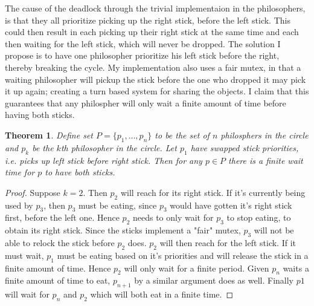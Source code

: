 \documentclass{article}
\newtheorem{theorem}[section]{Theorem}
\begin{document}
The cause of the deadlock through the trivial implementaion in the philosophers, is that they all prioritize picking up the right stick, before the left stick. This could then result in each picking up their right stick at the same time and each then waiting for the left stick, which will never be dropped. The solution I propose is to have one philosopher prioritize his left stick before the right, thereby breaking the cycle. My implementation also uses a fair mutex, in that a waiting philosopher will pickup the stick before the one who dropped it may pick it up again; creating a turn based system for sharing the objects. I claim that this guarantees that any philospher will only wait a finite amount of time before having both sticks.

\begin{theorem}
  Define set $P = \{p_1, \dots, p_n\}$ to be the set of $n$ philosphers in the circle and $p_k$ be the $k$th philosopher in the circle. Let $p_1$ have swapped stick priorities, i.e. picks up left stick before right stick. Then for any $p \in P$ there is a finite wait time for $p$ to have both sticks.
\end{theorem}

\begin{proof}
  Suppose $k = 2$. Then $p_2$ will reach for its right stick. If it's currently being used by $p_3$, then $p_3$ must be eating, since $p_3$ would have gotten it's right stick first, before the left one. Hence $p_2$ needs to only wait for $p_3$ to stop eating, to obtain its right stick. Since the sticks implement a "fair" mutex, $p_3$ will not be able to relock the stick before $p_2$ does. $p_2$ will then reach for the left stick. If it must wait, $p_1$ must be eating based on it's priorities and will release the stick in a finite amount of time. Hence $p_2$ will only wait for a finite period. Given $p_n$ waits a finite amount of time to eat, $p_{n+1}$ by a similar argument does as well. Finally $p1$ will wait for $p_n$ and $p_2$ which will both eat in a finite time.
\end{proof}
\end{document}
